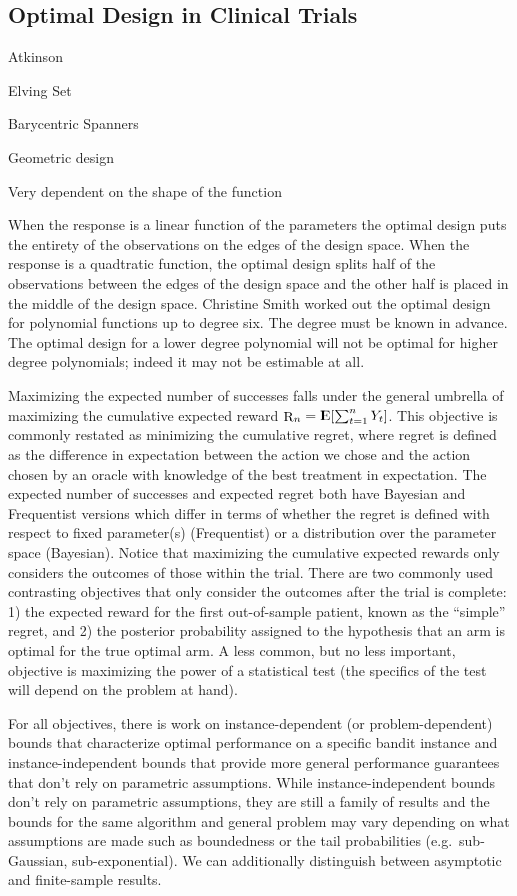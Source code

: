 \documentclass[12pt,,letterpaper,twoside]{report}
\DeclareMathOperator{\E}{{\rm I\kern-.3em E}}
\DeclareMathOperator{\R}{\rm R}
\begin{document}
\hypertarget{optimal-design-in-clinical-trials}{%
\subsection{Optimal Design in Clinical
Trials}\label{optimal-design-in-clinical-trials}}

Atkinson

Elving Set

Barycentric Spanners

Geometric design

Very dependent on the shape of the function

When the response is a linear function of the parameters the optimal
design puts the entirety of the observations on the edges of the design
space. When the response is a quadtratic function, the optimal design
splits half of the observations between the edges of the design space
and the other half is placed in the middle of the design space.
Christine Smith worked out the optimal design for polynomial functions
up to degree six. The degree must be known in advance. The optimal
design for a lower degree polynomial will not be optimal for higher
degree polynomials; indeed it may not be estimable at all.

Maximizing the expected number of successes falls under the general
umbrella of maximizing the cumulative expected reward
\(\R_n = \E[\sum_{t = 1}^n Y_t]\). This objective is commonly restated
as minimizing the cumulative regret, where regret is defined as the
difference in expectation between the action we chose and the action
chosen by an oracle with knowledge of the best treatment in expectation.
The expected number of successes and expected regret both have Bayesian
and Frequentist versions which differ in terms of whether the regret is
defined with respect to fixed parameter(s) (Frequentist) or a
distribution over the parameter space (Bayesian). Notice that maximizing
the cumulative expected rewards only considers the outcomes of those
within the trial. There are two commonly used contrasting objectives
that only consider the outcomes after the trial is complete: 1) the
expected reward for the first out-of-sample patient, known as the
``simple'' regret, and 2) the posterior probability assigned to the
hypothesis that an arm is optimal for the true optimal arm. A less
common, but no less important, objective is maximizing the power of a
statistical test (the specifics of the test will depend on the problem
at hand).

For all objectives, there is work on instance-dependent (or
problem-dependent) bounds that characterize optimal performance on a
specific bandit instance and instance-independent bounds that provide
more general performance guarantees that don't rely on parametric
assumptions. While instance-independent bounds don't rely on parametric
assumptions, they are still a family of results and the bounds for the
same algorithm and general problem may vary depending on what
assumptions are made such as boundedness or the tail probabilities
(e.g.~sub-Gaussian, sub-exponential). We can additionally distinguish
between asymptotic and finite-sample results.
\end{document}
